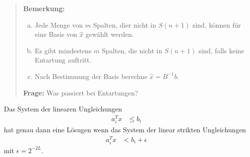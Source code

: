 \begin{quote}
\textbf{Bemerkung:}
\begin{enumerate}[(a)]
 \item Jede Menge von $m$ Spalten, dier nicht in $S(n+1)$ sind, können für eine Basis von $\hat{x}$ gewählt werden.
 \item Es gibt mindestens $m$ Spalten, die nicht in $S(n+1)$ sind, falls keine Entartung auftritt.
 \item Nach Bestimmung der Basis berechne $\hat{x} = B^{-1}b$.
\end{enumerate}
\textbf{Frage:} Was passiert bei Entartungen?
\end{quote}
\begin{lemma}
Das System der linearen Ungleichungen
\begin{align*}
a_i^Tx &\leq b_i \label{eq:li}\tag{LI}
\end{align*}
hat genau dann eine Lösugen wenn das System der linear strikten Ungleichungen
\begin{align*}
a_i^Tx &< b_i + \epsilon  \label{eq:lsi}\tag{LSI}
\end{align*}
mit $\epsilon = 2^{-2L}$.
\end{lemma}
